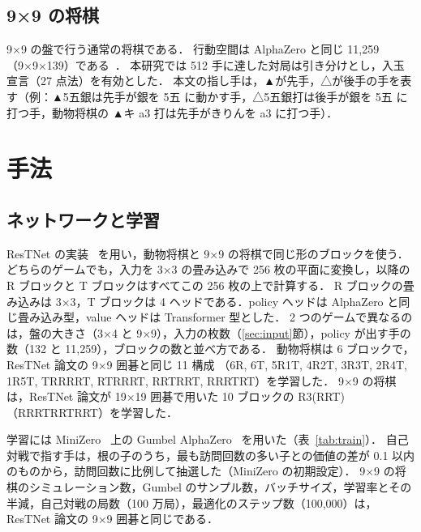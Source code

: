 \documentclass[submit]{ipsj}
\begin{document}
\subsection{9×9 の将棋}
9×9 の盤で行う通常の将棋である．
行動空間は AlphaZero と同じ 11,259（9×9×139）である~\cite{alphazero}．
本研究では 512 手に達した対局は引き分けとし，入玉宣言（27 点法）を有効とした．
本文の指し手は，▲が先手，△が後手の手を表す（例：▲5五銀は先手が銀を 5五 に動かす手，△5五銀打は後手が銀を 5五 に打つ手，動物将棋の ▲キ a3 打は先手がきりんを a3 に打つ手）．

\section{手法}
\subsection{ネットワークと学習}
ResTNet の実装~\cite{restnet} を用い，動物将棋と 9×9 の将棋で同じ形のブロックを使う．
どちらのゲームでも，入力を 3×3 の畳み込みで 256 枚の平面に変換し，以降の R ブロックと T ブロックはすべてこの 256 枚の上で計算する．
R ブロックの畳み込みは 3×3，T ブロックは 4 ヘッドである．policy ヘッドは AlphaZero と同じ畳み込み型，value ヘッドは Transformer 型とした．
2 つのゲームで異なるのは，盤の大きさ（3×4 と 9×9），入力の枚数（\ref{sec:input}節），policy が出す手の数（132 と 11,259），ブロックの数と並べ方である．
動物将棋は 6 ブロックで，ResTNet 論文の 9×9 囲碁と同じ 11 構成
（6R, 6T, 5R1T, 4R2T, 3R3T, 2R4T, 1R5T, TRRRRT, RTRRRT, RRTRRT, RRRTRT）を学習した．
9×9 の将棋は，ResTNet 論文が 19×19 囲碁で用いた 10 ブロックの R3(RRT)（RRRTRRTRRT）を学習した．

学習には MiniZero~\cite{minizero} 上の Gumbel AlphaZero~\cite{gumbel} を用いた（表~\ref{tab:train}）．
自己対戦で指す手は，根の子のうち，最も訪問回数の多い子との価値の差が 0.1 以内のものから，訪問回数に比例して抽選した（MiniZero の初期設定）．
9×9 の将棋のシミュレーション数，Gumbel のサンプル数，バッチサイズ，学習率とその半減，自己対戦の局数（100 万局），最適化のステップ数（100,000）は，ResTNet 論文の 9×9 囲碁と同じである．
\end{document}
